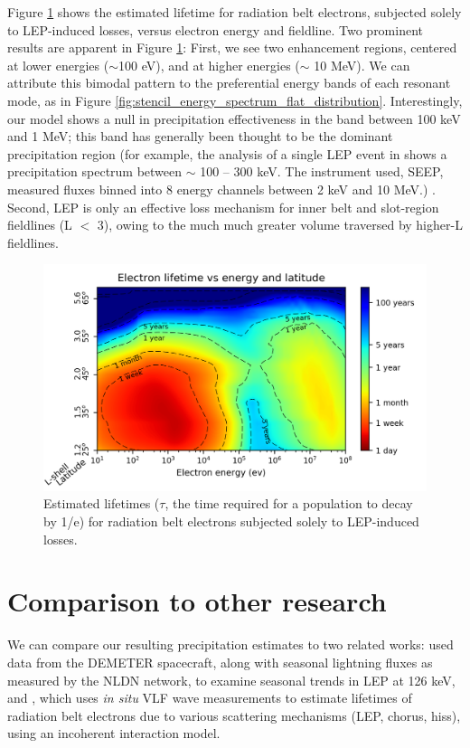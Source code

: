 Figure \ref{fig:electron_lifetimes} shows the estimated lifetime for radiation belt electrons, subjected solely to LEP-induced losses, versus electron energy and fieldline. Two prominent results are apparent in Figure \ref{fig:electron_lifetimes}: First, we see two enhancement regions, centered at lower energies ($\sim$100 eV), and at higher energies ($\sim$ 10 MeV). We can attribute this bimodal pattern to the preferential energy bands of each resonant mode, as in Figure \ref{fig:stencil_energy_spectrum_flat_distribution}. Interestingly, our model shows a null in precipitation effectiveness in the band between 100 keV and 1 MeV; this band has generally been thought to be the dominant precipitation region (for example, the analysis of a single LEP event in \cite{Voss1998} shows a precipitation spectrum between $\sim$ 100  -- 300 keV. The instrument used, SEEP, measured fluxes binned into 8 energy channels between 2 keV and 10 MeV.) . Second, LEP is only an effective loss mechanism for inner belt and slot-region fieldlines (L $<$ 3), owing to the much much greater volume traversed by higher-L fieldlines.
\begin{figure}[t]
\begin{center}
\includegraphics{figures/electron_lifetimes_updated_power_with_labels.png}
\caption[Estimated lifetime of radiation belt electrons subject to LEP losses only]{Estimated lifetimes ($\tau$, the time required for a population to decay by 1/e) for radiation belt electrons subjected solely to LEP-induced losses.}
\label{fig:electron_lifetimes}
\end{center}
\end{figure}


\section{Comparison to other research}
We can compare our resulting precipitation estimates to two related works: \cite{Gemelos2009} used data from the DEMETER spacecraft, along with seasonal lightning fluxes as measured by the NLDN network, to examine seasonal trends in LEP at 126 keV, and \cite{Meredith2007}, which uses \emph{in situ} VLF wave measurements to estimate lifetimes of radiation belt electrons due to various scattering mechanisms (LEP, chorus, hiss), using an incoherent interaction model.

